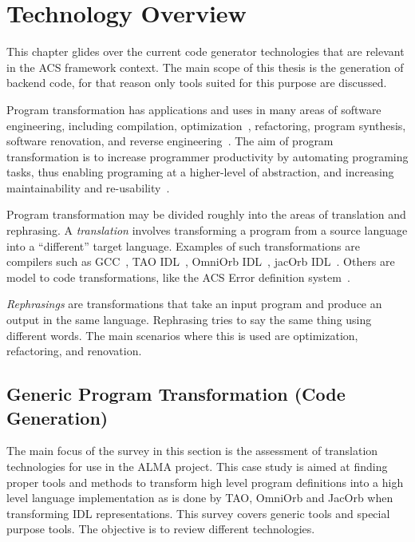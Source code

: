 \chapter[Technology Overview]{Technology Overview}
\label{ch:technology-overview}
This chapter glides over the current
code generator technologies
that are relevant in the ACS framework context.
The main scope of this thesis
is the generation of backend code,
for that reason only tools suited for this purpose
are discussed.

Program transformation has applications and uses
in many areas of software engineering,
including compilation,
optimization~\cite{grune02:_compiler_design},
refactoring,
program synthesis,
software renovation,
and reverse engineering~\cite{muller00:_rever_engin, RE-WEB}.
The aim of program transformation is to increase programmer productivity
by automating programing tasks,
thus enabling programing at a higher-level of abstraction,
and increasing maintainability and re-usability~\cite{visser01:_asurvey}.

Program transformation may be divided roughly into the areas of
translation and rephrasing.
A \emph{translation} involves transforming a program from a source language
into a ``different'' target language.
Examples of such transformations are compilers such as
GCC~\cite{GCC-WEB},
TAO IDL~\cite{TAO-WEB},
\mbox{OmniOrb} IDL~\cite{OMNIORB-WEB},
jacOrb IDL~\cite{JACORB-WEB}.
Others are model to code transformations,
like the
ACS Error definition system~\cite{jeram02:_ACS_error_system}.

\emph{Rephrasings} are transformations that take an input program
and produce an output in the same language.
Rephrasing tries to say the same thing using different words.
The main scenarios where this is used are optimization,
refactoring,
and renovation.

\section{Generic Program Transformation (Code Generation)}
\label{sec:translation}

The main focus of the survey in this section
is the assessment of translation technologies
for use in the ALMA project.
This case study is aimed at finding proper tools and methods
to transform high level program definitions
into a high level language implementation
as is done by TAO, OmniOrb and JacOrb when transforming IDL representations.
This survey covers generic tools and special purpose tools.
The objective is to review
different technologies.

